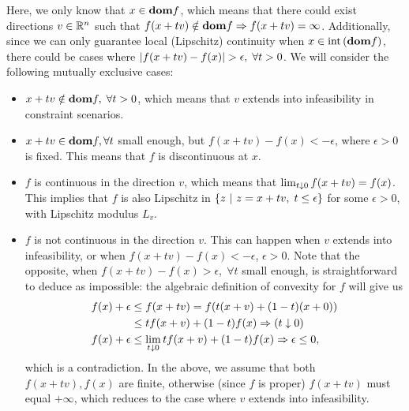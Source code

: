 \documentclass[10pt]{article}
\begin{document}
\begin{Exercise}
	Here, we only know that $x \in \textbf{dom} f$, which means that there could exist
	directions $v \in \mathbb{R}^n$ such that $f(x + tv) \notin \textbf{dom} f \Rightarrow
	f(x + tv) = \infty$. Additionally, since we can only guarantee local
	(Lipschitz) continuity when $x \in \mathrm{int}\left( \textbf{dom} f \right)$, there could be cases
	where $\left| f(x + tv) - f(x) \right| > \epsilon, \; \forall t > 0$. We will
	consider the following mutually exclusive cases:
	\begin{itemize}
		\item $x + tv \notin \textbf{dom} f, \; \forall t > 0$, which means that $v$
			extends into infeasibility in constraint scenarios.
		\item $x + tv \in \textbf{dom} f, \forall t$ small enough, but $f(x + tv) -
			f(x) < -\epsilon$, where $\epsilon > 0$ is fixed.
			This means that $f$ is discontinuous at $x$.
		\item $f$ is continuous in the direction $v$, which means that
        $\lim_{t \downarrow 0} f(x + tv) = f(x)$. This implies that $f$ is also
        Lipschitz in $\left\{ z \ \middle| \  z = x + tv, \; t \leq \epsilon \right\}$ for some
        $\epsilon > 0$, with Lipschitz modulus $L_v$.
        \item $f$ is not continuous in the direction $v$. This can happen when
        $v$ extends into infeasibility, or when $f(x + tv) - f(x) < -\epsilon$,
        $\epsilon > 0$. Note that the opposite, when $f(x + tv) - f(x) >
        \epsilon, \; \forall t$ small enough, is straightforward to deduce as
	   impossible: the algebraic definition of convexity for $f$ will give us
	   \begin{align*}
		  f(x) + \epsilon &\leq f(x + tv) = f(t(x + v) + (1 - t)(x + 0)) \\
			 &\leq t f(x + v) + (1 - t) f(x) \Rightarrow ( t \downarrow 0 ) \\
		  f(x) + \epsilon &\leq \lim_{t \downarrow 0} t f(x + v) + (1 - t) f(x)
		  \Rightarrow \epsilon \leq 0,
	   \end{align*}
	   which is a contradiction. In the above, we assume that both $f(x + tv),
	   f(x)$ are finite, otherwise (since $f$ is proper) $f(x + tv)$ must equal
	   $+\infty$, which reduces to the case where $v$ extends into
	   infeasibility.
    \end{itemize}


\end{Exercise}
\end{document}

